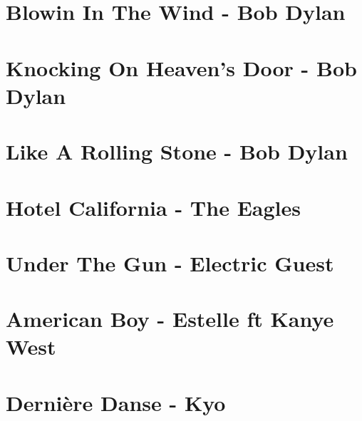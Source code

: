 \documentclass[11pt]{article}
\begin{document}
\section{Blowin In The Wind - Bob Dylan}
\begin{guitar}

\end{guitar}



\section{Knocking On Heaven's Door - Bob Dylan}
\begin{guitar}

\end{guitar}

\section*{Like A Rolling Stone - Bob Dylan}
\begin{guitar}

\end{guitar}



\section{Hotel California - The Eagles}
\begin{guitar}

\end{guitar}

\section{Under The Gun - Electric Guest}
\begin{guitar}

\end{guitar}


\section{American Boy - Estelle ft Kanye West}


\section{Dernière Danse - Kyo}
\begin{guitar}

\end{guitar}
\end{document}
